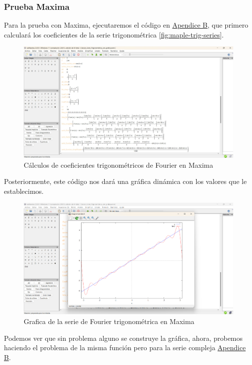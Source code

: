 \subsubsection{Prueba Maxima}
Para la prueba con Maxima, ejecutaremos el código en \hyperref[app2:trig-code-maxima]{Apendice B}, que primero calculará los coeficientes de la serie trigonométrica \ref{fig:maple-trig-series}. 
\begin{figure}[H]
	\centering
	\includegraphics[width=1\textwidth]{img/chapter02/maxima-trig-series-coeff.jpeg}
	\caption{Cálculos de coeficientes trigonométricos de Fourier en Maxima}
	\label{fig:maxima-trig-series}  %
\end{figure}
Posteriormente, este código nos dará una gráfica dinámica con los valores que le establecimos.
\begin{figure}[H]
	\centering
	\includegraphics[width=1\textwidth]{img/chapter02/maxima-trig-series-graph.png}
	\caption{Grafica de la serie de Fourier trigonométrica en Maxima}
	\label{fig:maxima-trig-series-graph}  %
\end{figure}

Podemos ver que sin problema alguno se construye la gráfica, ahora, probemos haciendo el problema de la misma función pero para la serie compleja  \hyperref[app2:complex-code-maxima]{Apendice B}. 

